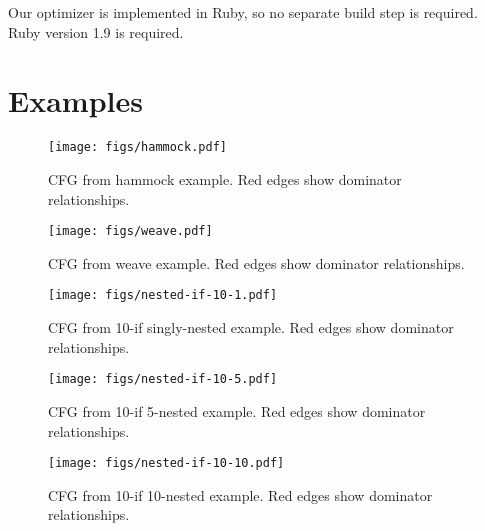 \documentclass[10pt,twocolumn]{article}
\begin{document}
Our optimizer is implemented in Ruby, so no separate build step is
required. Ruby version 1.9 is required.

\section{Examples}

\begin{figure}
\begin{center}
  \texttt{[image: figs/hammock.pdf]}
\begin{minipage}{0.95\columnwidth}
  \caption{\label{fig:hammock} CFG from hammock example. Red edges show dominator relationships.}
\end{minipage}
\end{center}
\end{figure}

\begin{figure}
\begin{center}
  \texttt{[image: figs/weave.pdf]}
\begin{minipage}{0.95\columnwidth}
  \caption{\label{fig:weave} CFG from weave example. Red edges show dominator relationships.}
\end{minipage}
\end{center}
\end{figure}

\begin{figure}
\begin{center}
  \texttt{[image: figs/nested-if-10-1.pdf]}
  \caption{CFG from 10-if singly-nested example. Red edges show dominator relationships.}
  \label{fig:nest-10-1}
\end{center}
\end{figure}

\begin{figure}
\begin{center}
  \texttt{[image: figs/nested-if-10-5.pdf]}
  \caption{CFG from 10-if 5-nested example. Red edges show dominator relationships.}
  \label{fig:nest-10-5} 
\end{center}
\end{figure}

\begin{figure}
\begin{center}
  \texttt{[image: figs/nested-if-10-10.pdf]}
  \caption{CFG from 10-if 10-nested example. Red edges show dominator relationships.}
  \label{fig:nest-10-10} 
\end{center}
\end{figure}
\end{document}
